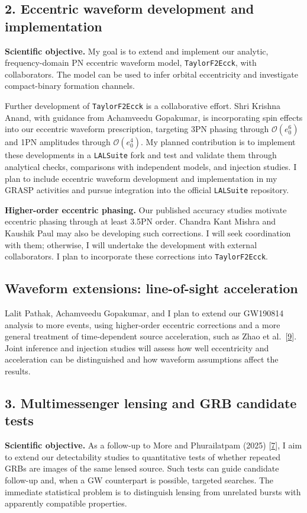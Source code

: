 \documentclass[11pt]{article}
\begin{document}
\subsection*{2. Eccentric waveform development and implementation}
\textbf{Scientific objective.} My goal is to extend and implement our analytic, frequency-domain PN eccentric waveform model, \texttt{TaylorF2Ecck}, with collaborators. The model can be used to infer orbital eccentricity and investigate compact-binary formation channels.

Further development of \texttt{TaylorF2Ecck} is a collaborative effort. Shri Krishna Anand, with guidance from Achamveedu Gopakumar, is incorporating spin effects into our eccentric waveform prescription, targeting 3PN phasing through $\mathcal{O}(e_0^6)$ and 1PN amplitudes through $\mathcal{O}(e_0^4)$. My planned contribution is to implement these developments in a \texttt{LALSuite} fork and test and validate them through analytical checks, comparisons with independent models, and injection studies. I plan to include eccentric waveform development and implementation in my GRASP activities and pursue integration into the official \texttt{LALSuite} repository.

\newpage
\textbf{Higher-order eccentric phasing.} Our published accuracy studies motivate eccentric phasing through at least 3.5PN order. Chandra Kant Mishra and Kaushik Paul may also be developing such corrections. I will seek coordination with them; otherwise, I will undertake the development with external collaborators. I plan to incorporate these corrections into \texttt{TaylorF2Ecck}.

\subsection*{Waveform extensions: line-of-sight acceleration}
Lalit Pathak, Achamveedu Gopakumar, and I plan to extend our GW190814 analysis to more events, using higher-order eccentric corrections and a more general treatment of time-dependent source acceleration, such as Zhao et al.~[\hyperlink{ref9}{9}]. Joint inference and injection studies will assess how well eccentricity and acceleration can be distinguished and how waveform assumptions affect the results.

\subsection*{3. Multimessenger lensing and GRB candidate tests}
\textbf{Scientific objective.} As a follow-up to More and Phurailatpam (2025) [\hyperlink{ref7}{7}], I aim to extend our detectability studies to quantitative tests of whether repeated GRBs are images of the same lensed source. Such tests can guide candidate follow-up and, when a GW counterpart is possible, targeted searches. The immediate statistical problem is to distinguish lensing from unrelated bursts with apparently compatible properties.
\end{document}
